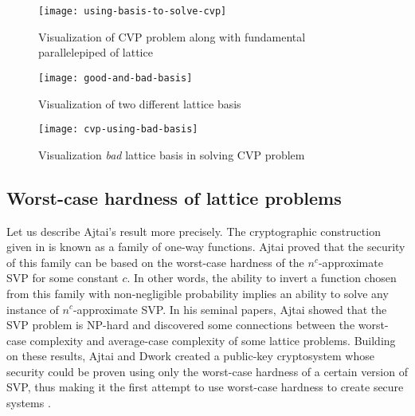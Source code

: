 \begin{figure}[H]
    \centering
    \texttt{[image: using-basis-to-solve-cvp]}
    \caption{Visualization of $\mathrm{CVP}$ problem along with fundamental parallelepiped of lattice}
\end{figure}
    
    
    
\begin{figure}[H]
    \centering
    \texttt{[image: good-and-bad-basis]}
    \caption{Visualization of two different lattice basis}
\end{figure}
    
    
    
\begin{figure}[H]
    \centering
    \texttt{[image: cvp-using-bad-basis]}
    \caption{Visualization \textit{bad} lattice basis in solving $\mathrm{CVP}$ problem}
\end{figure}
    







\subsection{Worst-case hardness of lattice problems}
Let us describe Ajtai's result more precisely. The cryptographic construction given in \cite{ajtai1996generating} is known as a family of one-way functions. Ajtai proved that the security of this family can be based on the worst-case hardness of the $n^c$-approximate SVP for some constant $c$. In other words, the ability to invert a function chosen from this family with non-negligible probability implies an ability to solve any instance of $n^c$-approximate SVP. In his seminal papers, Ajtai showed that the SVP problem is NP-hard and discovered some connections between the worst-case complexity and average-case complexity of some lattice problems. Building on these results, Ajtai and Dwork created a public-key cryptosystem whose security could be proven using only the worst-case hardness of a certain version of SVP, thus making it the first attempt to use worst-case hardness to create secure systems \cite{Ajtai:1997:PCW:258533.258604}.


